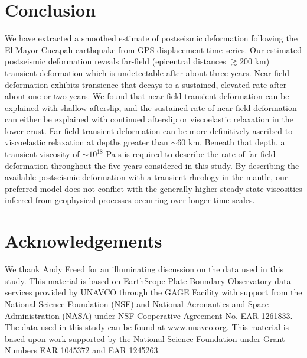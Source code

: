 \documentclass[draft,linenumbers]{AGUJournal}
\begin{document}
\section{Conclusion}

We have extracted a smoothed estimate of postseismic deformation following the El Mayor-Cucapah earthquake from GPS displacement time series.  Our estimated postseismic deformation reveals far-field (epicentral distances ${\gtrsim}200$ km) transient deformation which is undetectable after about three years. Near-field deformation exhibits transience that decays to a sustained, elevated rate after about one or two years.  We found that near-field transient deformation can be explained with shallow afterslip, and the sustained rate of near-field deformation can either be explained with continued afterslip or viscoelastic relaxation in the lower crust.  Far-field transient deformation can be more definitively ascribed to viscoelastic relaxation at depths greater than ${\sim}60$ km. Beneath that depth, a transient viscosity of ${\sim}10^{18}$ Pa s is required to describe the rate of far-field deformation throughout the five years considered in this study.  By describing the available postseismic deformation with a transient rheology in the mantle, our preferred model does not conflict with the generally higher steady-state viscosities inferred from geophysical processes occurring over longer time scales.

\section*{Acknowledgements}
We thank Andy Freed for an illuminating discussion on the data used in this study.  This material is based on EarthScope Plate Boundary Observatory data services provided by UNAVCO through the GAGE Facility with support from the National Science Foundation (NSF) and National Aeronautics and Space Administration (NASA) under NSF Cooperative Agreement No. EAR-1261833.  The data used in this study can be found at www.unavco.org. This material is based upon work supported by the National Science Foundation under Grant Numbers EAR 1045372 and EAR 1245263.


%
%
%
%
%
%
\end{document}
